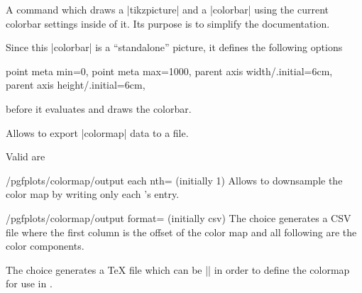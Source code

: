 \begin{command}{\pgfplotscolorbardrawstandalone{}}
    A command which draws a |tikzpicture| and a |colorbar| using the current
    colorbar settings inside of it. Its purpose is to simplify the
    documentation.

    Since this |colorbar| is a ``standalone'' picture, it defines the following
    options
\begin{codeexample}
    point meta min=0,
    point meta max=1000,
    parent axis width/.initial=6cm,
    parent axis height/.initial=6cm,
\end{codeexample}
    before it evaluates  and draws the colorbar.
\end{command}

\begin{command}{\pgfplotscolormaptodatafile{}}
    Allows to export |colormap| data to a file.
\begin{codeexample}[]
\end{codeexample}

\begin{codeexample}[]
\end{codeexample}

    Valid  are
    \begin{pgfplotskey}{/pgfplots/colormap/output each nth= (initially 1)}
        Allows to downsample the color map by writing only each 's
        entry.
    \end{pgfplotskey}

    \begin{pgfplotskey}{/pgfplots/colormap/output format= (initially csv)}
        The choice  generates a CSV file where the first
        column is the offset of the color map and all following are the color
        components.

        The choice  generates a \TeX{} file which can be
        || in order to define the colormap for use in \PGFPlots{}.
    \end{pgfplotskey}
\end{command}

